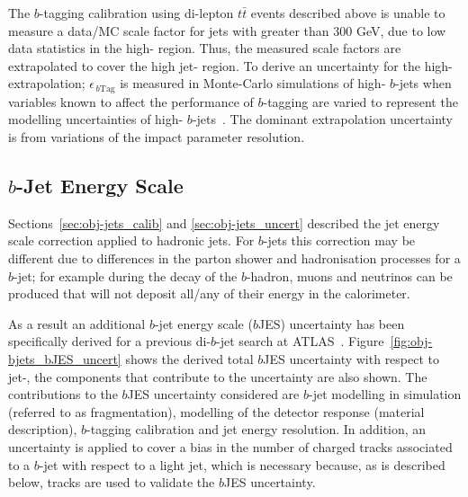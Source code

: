 The $b$-tagging calibration using di-lepton $t\bar{t}$ events described above
is unable to measure a data/MC scale factor for jets with \pT{} greater than 300 GeV, due to low data statistics in the high-\pT{} region.
Thus, the measured scale factors are extrapolated to cover the high jet-\pT{} region.
To derive an uncertainty for the high-\pT{} extrapolation; $\epsilon_{\,b\text{Tag}}$ is measured in Monte-Carlo simulations of high-\pT{} $b$-jets  
when variables known to affect the performance of $b$-tagging are varied to represent the modelling uncertainties of high-\pT{} $b$-jets~\cite{obj-bjets_calib_highPt}.
The dominant extrapolation uncertainty is from variations of the impact parameter resolution.

\subsection{$b$-Jet Energy Scale}
\label{sec:obj-bjets_bjes}

Sections~\ref{sec:obj-jets_calib} and \ref{sec:obj-jets_uncert} described the
jet energy scale correction applied to hadronic jets.
For $b$-jets this correction may be different due to differences in the parton shower and hadronisation processes for a $b$-jet;
for example during the decay of the $b$-hadron, muons and neutrinos can be produced that will not deposit all/any of their energy in the calorimeter.

As a result an additional $b$-jet energy scale ($b$JES) uncertainty has been 
specifically derived for a previous di-$b$-jet search at ATLAS~\cite{dibjet-mori16_paper}.
Figure~\ref{fig:obj-bjets_bJES_uncert} shows the derived total $b$JES uncertainty with respect to jet-\pT{},
the components that contribute to the uncertainty are also shown.
The contributions to the $b$JES uncertainty considered are $b$-jet modelling in simulation (referred to as fragmentation),
modelling of the detector response (material description), $b$-tagging calibration and jet energy resolution.
In addition, an uncertainty is applied to cover a bias in the number of charged tracks associated to a $b$-jet with respect to a light jet,
which is necessary because, as is described below, tracks are used to validate the $b$JES uncertainty.

